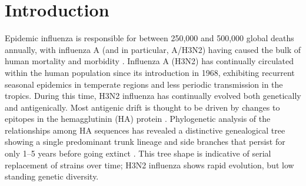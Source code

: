 \documentclass[11pt,oneside,letterpaper]{article}
\begin{document}


\section*{Introduction}

Epidemic influenza is responsible for between 250,000 and 500,000 global deaths annually, with influenza A (and in particular, A/H3N2) having caused the bulk of human mortality and morbidity \cite{flufactsheet}.  Influenza A (H3N2) has continually circulated within the human population since its introduction in 1968, exhibiting recurrent seasonal epidemics in temperate regions and less periodic transmission in the tropics.  During this time, H3N2 influenza has continually evolved both genetically and antigenically.  Most antigenic drift is thought to be driven by changes to epitopes in the hemagglutinin (HA) protein \cite{Nelson07NatRevGenet}.  Phylogenetic analysis of the relationships among HA sequences has revealed a distinctive genealogical tree showing a single predominant trunk lineage and side branches that persist for only 1--5 years before going extinct \cite{Fitch97}.  This tree shape is indicative of serial replacement of strains over time; H3N2 influenza shows rapid evolution, but low standing genetic diversity.
\end{document}

